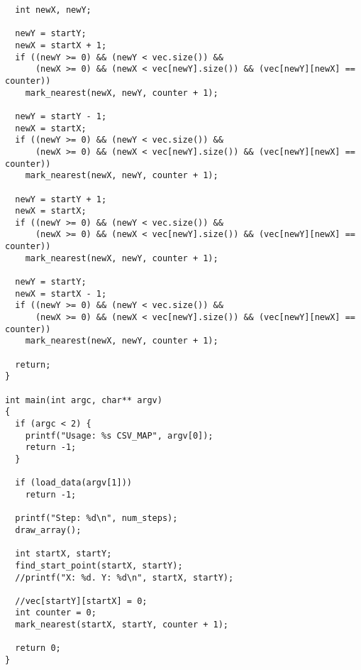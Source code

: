 \begin{verbatim}
  int newX, newY;

  newY = startY;
  newX = startX + 1;
  if ((newY >= 0) && (newY < vec.size()) &&
      (newX >= 0) && (newX < vec[newY].size()) && (vec[newY][newX] == counter))
    mark_nearest(newX, newY, counter + 1);

  newY = startY - 1;
  newX = startX;
  if ((newY >= 0) && (newY < vec.size()) &&
      (newX >= 0) && (newX < vec[newY].size()) && (vec[newY][newX] == counter))
    mark_nearest(newX, newY, counter + 1);

  newY = startY + 1;
  newX = startX;
  if ((newY >= 0) && (newY < vec.size()) &&
      (newX >= 0) && (newX < vec[newY].size()) && (vec[newY][newX] == counter))
    mark_nearest(newX, newY, counter + 1);

  newY = startY;
  newX = startX - 1;
  if ((newY >= 0) && (newY < vec.size()) &&
      (newX >= 0) && (newX < vec[newY].size()) && (vec[newY][newX] == counter))
    mark_nearest(newX, newY, counter + 1);

  return;
}

int main(int argc, char** argv)
{
  if (argc < 2) {
    printf("Usage: %s CSV_MAP", argv[0]);
    return -1;
  }

  if (load_data(argv[1]))
    return -1;

  printf("Step: %d\n", num_steps);
  draw_array();

  int startX, startY;
  find_start_point(startX, startY);
  //printf("X: %d. Y: %d\n", startX, startY);

  //vec[startY][startX] = 0;
  int counter = 0;
  mark_nearest(startX, startY, counter + 1);

  return 0;
}
\end{verbatim}
